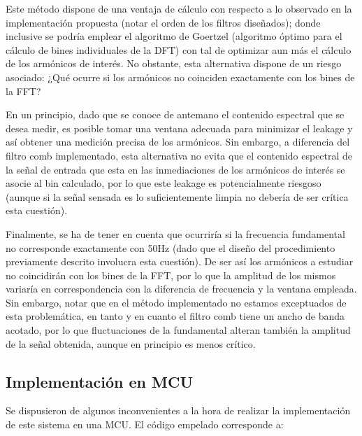Este método dispone de una ventaja de cálculo con respecto a lo observado en la implementación propuesta (notar el orden de los filtros diseñados); donde inclusive se podría emplear el algoritmo de Goertzel (algoritmo óptimo para el cálculo de bines individuales de la DFT) con tal de optimizar aun más el cálculo de los armónicos de interés. No obstante, esta alternativa dispone de un riesgo asociado: ¿Qué ocurre si los armónicos no coinciden exactamente con los bines de la FFT?

En un principio, dado que se conoce de antemano el contenido espectral que se desea medir, es posible tomar una ventana adecuada para minimizar el leakage y así obtener una medición precisa de los armónicos. Sin embargo, a diferencia del filtro comb implementado, esta alternativa no evita que el contenido espectral de la señal de entrada que esta en las inmediaciones de los armónicos de interés se asocie al bin calculado, por lo que este leakage es potencialmente riesgoso (aunque si la señal sensada es lo suficientemente limpia no debería de ser crítica esta cuestión). 

Finalmente, se ha de tener en cuenta que ocurriría si la frecuencia fundamental no corresponde exactamente con 50Hz (dado que el diseño del procedimiento previamente descrito involucra esta cuestión). De ser así los armónicos a estudiar no coincidirán con los bines de la FFT, por lo que la amplitud de los mismos variaría en correspondencia con la diferencia de frecuencia y la ventana empleada. Sin embargo, notar que en el método implementado no estamos exceptuados de esta problemática, en tanto y en cuanto el filtro comb tiene un ancho de banda acotado, por lo que fluctuaciones de la fundamental alteran también la amplitud de la señal obtenida, aunque en principio es menos crítico.


\subsection{Implementación en MCU}
Se dispusieron de algunos inconvenientes a la hora de realizar la implementación de este sistema en una MCU. El código empelado corresponde a:


